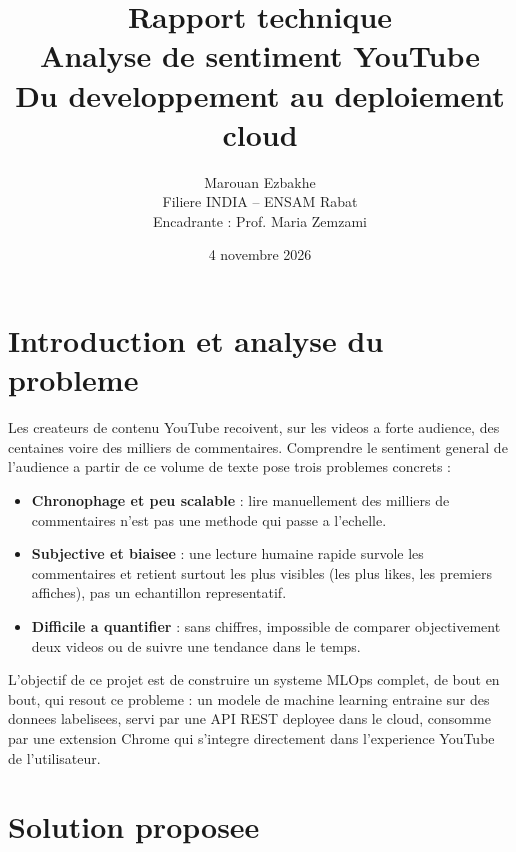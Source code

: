 \documentclass[11pt,a4paper]{article}
\title{\textbf{\Large Rapport technique}\\[0.3cm]\LARGE Analyse de sentiment YouTube\\\large Du developpement au deploiement cloud}
\author{Marouan Ezbakhe\\Filiere INDIA -- ENSAM Rabat\\Encadrante : Prof. Maria Zemzami}
\date{4 novembre 2026}
\begin{document}
\maketitle
\thispagestyle{empty}

\begin{center}
\end{center}

\newpage
\tableofcontents
\newpage

\section{Introduction et analyse du probleme}

Les createurs de contenu YouTube recoivent, sur les videos a forte audience, des centaines voire des milliers de commentaires. Comprendre le sentiment general de l'audience a partir de ce volume de texte pose trois problemes concrets :

\begin{itemize}
  \item \textbf{Chronophage et peu scalable} : lire manuellement des milliers de commentaires n'est pas une methode qui passe a l'echelle.
  \item \textbf{Subjective et biaisee} : une lecture humaine rapide survole les commentaires et retient surtout les plus visibles (les plus likes, les premiers affiches), pas un echantillon representatif.
  \item \textbf{Difficile a quantifier} : sans chiffres, impossible de comparer objectivement deux videos ou de suivre une tendance dans le temps.
  \end{itemize}

L'objectif de ce projet est de construire un systeme MLOps complet, de bout en bout, qui resout ce probleme : un modele de machine learning entraine sur des donnees labelisees, servi par une API REST deployee dans le cloud, consomme par une extension Chrome qui s'integre directement dans l'experience YouTube de l'utilisateur.

\section{Solution proposee}
\end{document}
